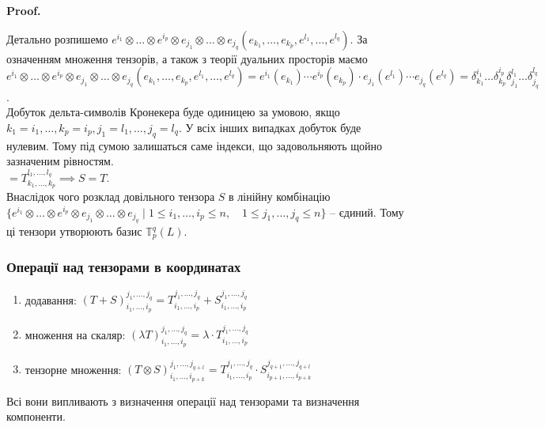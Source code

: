 \documentclass[a4paper, 10pt]{article}
\makeatletter
\theoremstyle{theoremdd}
\renewenvironment{proof}[1][Proof.\\]{\par
\pushQED{\hfill \qed}%
\normalfont \topsep6\p@\@plus6\p@\relax
\trivlist
\item\relax
{\bfseries
#1\@addpunct{.}}\hspace\labelsep\ignorespaces
}{%
\popQED\endtrivlist\@endpefalse
}
\makeatother
\begin{document}
\begin{proof}
Детально розпишемо $e^{i_1} \otimes \dots \otimes e^{i_p} \otimes e_{j_1} \otimes \dots \otimes e_{j_q} (e_{k_1},\dots,e_{k_p},e^{l_1},\dots,e^{l_q})$. За означенням множення тензорів, а також з теорії дуальних просторів маємо\\
$e^{i_1} \otimes \dots \otimes e^{i_p} \otimes e_{j_1} \otimes \dots \otimes e_{j_q} (e_{k_1},\dots,e_{k_p},e^{l_1},\dots,e^{l_q}) = e^{i_1}(e_{k_1}) \cdots e^{i_p}(e_{k_p}) \cdot e_{j_1}(e^{l_1}) \cdots e_{j_q}(e^{l_q}) = \delta_{k_1}^{i_1} \dots \delta_{k_p}^{i_p} \delta_{j_1}^{l_1} \dots \delta_{j_q}^{l_q}$.\\
Добуток дельта-символів Кронекера буде одиницею за умовою, якщо $k_1 = i_1, \dots, k_p = i_p, j_1 = l_1, \dots, j_q = l_q$. У всіх інших випадках добуток буде нулевим. Тому під сумою залишаться саме індекси, що задовольняють щойно зазначеним рівностям.\\
$\boxed{=} T_{k_1,\dots,k_p}^{l_1,\dots,l_q} \implies S = T$.
\bigskip \\
Внаслідок чого розклад довільного тензора $S$ в лінійну комбінацію $\{ e^{i_1} \otimes \dots \otimes e^{i_p} \otimes e_{j_1} \otimes \dots \otimes e_{j_q} \mid 1 \leq i_1,\dots,i_p \leq n, \quad 1 \leq j_1,\dots,j_q \leq n \}$ -- єдиний. Тому ці тензори утворюють базис $\mathbb{T}_p^q(L)$.
\end{proof}

\subsubsection*{Операції над тензорами в координатах}
\begin{enumerate}[nosep,wide=0pt,label={\arabic*)}]
\item додавання: $(T+S)_{i_1, \dots, i_p}^{j_1,\dots,j_q} = T_{i_1, \dots, i_p}^{j_1,\dots,j_q} + S_{i_1, \dots, i_p}^{j_1,\dots,j_q}$
\item множення на скаляр: $(\lambda T)_{i_1, \dots, i_p}^{j_1,\dots,j_q} = \lambda \cdot T_{i_1, \dots, i_p}^{j_1,\dots,j_q}$
\item тензорне множення: $(T \otimes S)_{i_1,\dots,i_{p+k}}^{j_1,\dots,j_{q+l}} = T_{i_1,\dots,i_p}^{j_1,\dots,j_q} \cdot S_{i_{p+1},\dots,i_{p+k}}^{j_{q+1},\dots,j_{q+l}}$
\end{enumerate}
Всі вони випливають з визначення операції над тензорами та визначення компоненти.
\end{document}
